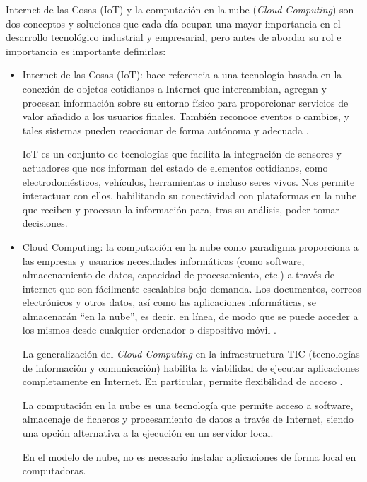 Internet de las Cosas (IoT) y la computación en la nube (\emph{Cloud Computing}) son dos conceptos y soluciones que cada día ocupan una mayor importancia en el desarrollo tecnológico industrial y empresarial, pero antes de abordar su rol e importancia es importante definirlas:



\begin{itemize}
\item Internet de las Cosas (IoT): hace referencia a una tecnología basada en la conexión de objetos cotidianos a Internet que intercambian, agregan y procesan información sobre su entorno físico para proporcionar servicios de valor añadido a los usuarios finales. También reconoce eventos o cambios, y tales sistemas pueden reaccionar de forma autónoma y adecuada \citep{BOOK:1}.

IoT es un conjunto de tecnologías que facilita la integración de sensores y actuadores que nos informan del estado de elementos cotidianos, como electrodomésticos, vehículos, herramientas o incluso seres vivos. Nos permite interactuar con ellos, habilitando su conectividad con plataformas en la nube que reciben y procesan la información para, tras su análisis, poder tomar decisiones.

\item Cloud Computing: la computación en la nube como paradigma proporciona a las empresas y usuarios necesidades informáticas (como software, almacenamiento de datos, capacidad de procesamiento, etc.) a través de internet que son fácilmente escalables bajo demanda. Los documentos, correos electrónicos y otros datos, así como las aplicaciones informáticas, se almacenarán ``en la nube'', es decir, en línea, de modo que se puede acceder a los mismos desde cualquier ordenador o dispositivo móvil \citep{BOOK:1}.

La generalización del \emph{Cloud Computing} en la infraestructura TIC (tecnologías de información y comunicación) habilita la viabilidad de ejecutar aplicaciones completamente en Internet. En particular, permite flexibilidad de acceso \citep{BOOK:1}.

La computación en la nube es una tecnología que permite acceso a software, almacenaje de ficheros y procesamiento de datos a través de Internet, siendo una opción alternativa a la ejecución en un servidor local. 

En el modelo de nube, no es necesario instalar aplicaciones de forma local en computadoras.

\end{itemize}

